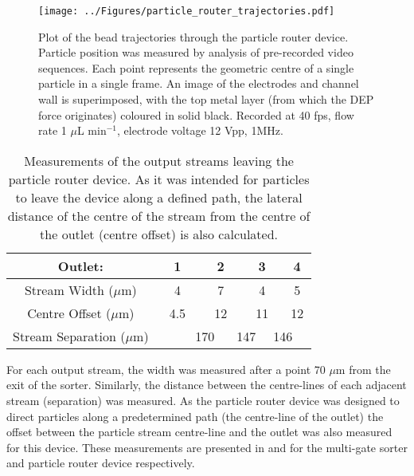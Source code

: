 \clearpage


\begin{figure}[p]
 \centering
 \texttt{[image: ../Figures/particle\_router\_trajectories.pdf]}
 \caption[Plot of the particle trajectories through the particle router device.]{Plot of the bead trajectories through the particle router device. Particle position was measured by analysis of pre-recorded video sequences. Each point represents the geometric centre of a single particle in a single frame. An image of the electrodes and channel wall is superimposed, with the top metal layer (from which the DEP force originates) coloured in solid black. Recorded at 40 fps, flow rate 1 $\mu$L min$^{-1}$, electrode voltage 12 Vpp, 1MHz.}
 \label{fig:particle_router_trajectories}
 
 \end{figure}


\begin{table}[p]
	\centering
		\begin{tabular} {c c c c c c c c c}
		\hline
		Outlet: & \multicolumn{2}{c}{1} & \multicolumn{2}{c}{2} & \multicolumn{2}{c}{3} & \multicolumn{2}{c}{4} \\
		\hline
		Stream Width ($\mu$m) &	\multicolumn{2}{c}{4} & \multicolumn{2}{c}{7} & \multicolumn{2}{c}{4} & \multicolumn{2}{c}{5} \\
		Centre Offset ($\mu$m) &	\multicolumn{2}{c}{4.5} & \multicolumn{2}{c}{12} & \multicolumn{2}{c}{11} & \multicolumn{2}{c}{12} \\
		Stream Separation ($\mu$m) & &	\multicolumn{2}{c}{170} & \multicolumn{2}{c}{147} & \multicolumn{2}{c}{146} &  \\
		\hline			
		\end{tabular}
	\caption[Measurements of the output streams leaving the particle router device.]{Measurements of the output streams leaving the particle router device. As it was intended for particles to leave the device along a defined path, the lateral distance of the centre of the stream from the centre of the outlet (centre offset) is also calculated.}
	\label{tab:particle_router_stream_measurements}
\end{table}

\clearpage

For each output stream, the width was measured after a point 70 $\mu$m from the exit of the sorter. Similarly, the distance between the centre-lines of each adjacent stream (separation) was measured. As the particle router device was designed to direct particles along a predetermined path (the centre-line of the outlet) the offset between the particle stream centre-line and the outlet was also measured for this device. These measurements are presented in  and  for the multi-gate sorter and particle router device respectively.

